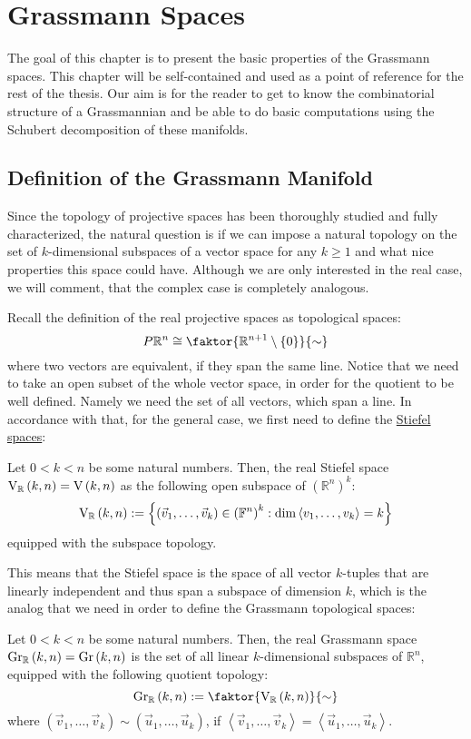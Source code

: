 \chapter{Grassmann Spaces}
The goal of this chapter is to present the basic properties of the Grassmann spaces. This chapter will be self-contained and used as a point of reference for the rest of the thesis. Our aim is for the reader to get to know the combinatorial structure of a Grassmannian and be able to do basic computations using the Schubert decomposition of these manifolds. 

\section{Definition of the Grassmann Manifold}
Since the topology of projective spaces has been thoroughly studied and fully characterized, the natural question is if we can impose a natural topology on the set of $k$-dimensional subspaces of a vector space for any $k\geq1$ and what nice properties this space could have. Although we are only interested in the real case, we will comment, that the complex case is completely analogous.

Recall the definition of the real projective spaces as topological spaces:
$$P\mathbb{R}^n\cong\faktor{\mathbb{R}^{n+1}\setminus\{0\}}{\sim}$$
where two vectors are equivalent, if they span the same line. Notice that we need to take an open subset of the whole vector space, in order for the quotient to be well defined. Namely we need the set of all vectors, which span a line. In accordance with that, for the general case, we first need to define the \ul{Stiefel spaces}:

\begin{definition} Let $0<k<n$ be some natural numbers. Then, the real Stiefel space $\St{k}{n}{\mathbb{R}}=\St{k}{n}$ as the following open subspace of $\left(\mathbb{R}^n\right)^k$:
$$\St{k}{n}{\mathbb{R}}:=\left\{\left(\vec{v}_1,\ldots,\vec{v}_k\right)\in\left(\mathbb{F}^n\right)^k:\dim\left<v_1,\ldots,v_k\right>=k\right\}$$
equipped with the subspace topology.
\end{definition}

This means that the Stiefel space is the space of all vector $k$-tuples that are linearly independent and thus span a subspace of dimension $k$, which is the analog that we need in order to define the Grassmann topological spaces:

\begin{definition} Let $0<k<n$ be some natural numbers. Then, the real Grassmann space $\Gr{k}{n}{\mathbb{R}}=\Gr{k}{n}$ is the set of all linear $k$-dimensional subspaces of $\mathbb{R}^n$, equipped with the following quotient topology:
$$\Gr{k}{n}{\mathbb{R}}:=\faktor{\St{k}{n}{\mathbb{R}}}{\sim}$$
where $(\vec{v}_1,\ldots,\vec{v}_k)\sim(\vec{u}_1,\ldots,\vec{u}_k)$, if $\left<\vec{v}_1,\ldots,\vec{v}_k\right>=\left<\vec{u}_1,\ldots,\vec{u}_k\right>$.
\end{definition}


